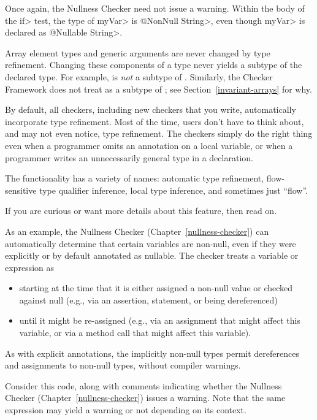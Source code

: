 \noindent
Once again, the Nullness Checker need not issue a warning.  Within the body
of the \<if> test, the type of \<myVar> is \<@NonNull String>, even though
\<myVar> is declared as \<@Nullable String>.


Array element types and generic arguments are never changed by type
refinement.  Changing these components of a type never yields a subtype of
the declared type.  For example,  is \emph{not} a
subtype of .  Similarly, the Checker Framework does not
treat  as a subtype of
; see Section~\ref{invariant-arrays} for why.



By default, all checkers, including new checkers that you write,
automatically incorporate type refinement.  Most of the time, users don't
have to think about, and may not even notice, type refinement.  The
checkers simply do the right thing even when a programmer omits an
annotation on a local variable, or when a programmer writes an
unnecessarily general type in a declaration.

The functionality has a variety of names:  automatic type refinement,
flow-sensitive type qualifier inference, local type inference, and
sometimes just ``flow''.

If you are curious or want more details about this feature, then read on.

As an example, the Nullness Checker (Chapter~\ref{nullness-checker}) can automatically
determine that certain variables are non-null, even if they were explicitly
or by default annotated as nullable.
The checker treats a variable or expression as 
\begin{itemize}
\item
starting at the time that it is either
assigned a non-null value or checked against null (e.g., via an assertion,
 statement, or being dereferenced)
\item
until it might be re-assigned (e.g.,
via an assignment that might affect this variable, or via a method call
that might affect this variable).
\end{itemize}

As with explicit annotations, the implicitly non-null types permit
dereferences and assignments to non-null types, without
compiler warnings.

Consider this code, along with comments indicating whether the
Nullness Checker (Chapter~\ref{nullness-checker}) issues a warning.  Note that the same expression may yield a
warning or not depending on its context.

